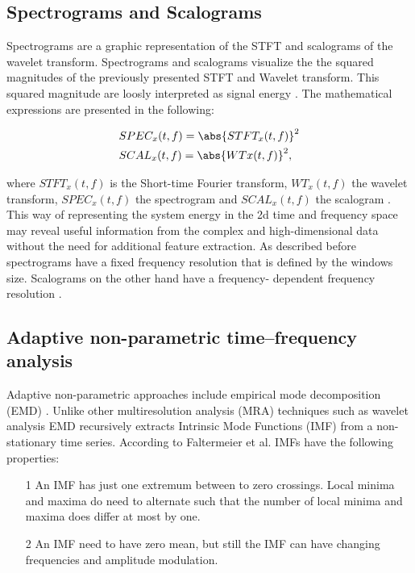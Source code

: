 \subsection{Spectrograms and Scalograms}

 Spectrograms are a graphic representation of the STFT and scalograms of the wavelet transform. Spectrograms and scalograms visualize the the squared magnitudes of the previously presented STFT and Wavelet transform. This squared magnitude are loosly interpreted as signal energy \cite{Hlawatsch1992}. The mathematical expressions are presented in the following: 

\begin{equation}
    \begin{aligned}
        &SPEC_{x}(t,f) = \abs{STFT_{x}(t,f)}^{2} \\
        &SCAL_{x}(t,f) = \abs{WT{x}(t,f)}^{2}, 
    \end{aligned}
\end{equation}

where $STFT_{x}(t,f)$ is the Short-time Fourier transform, $WT_{x}(t,f)$ the wavelet transform, $SPEC_{x}(t,f)$ the spectrogram and $SCAL_{x}(t,f)$ the scalogram \cite{Hlawatsch1992}. This way of representing the system energy in the 2d time and frequency space may reveal useful information from the complex and high-dimensional data without the need for additional feature extraction. As described before spectrograms have a fixed frequency resolution that is defined by the windows size. Scalograms on the other hand have a frequency- dependent frequency resolution \cite{Verstraete2017}.

\subsection{Adaptive non-parametric time–frequency analysis}
Adaptive non-parametric approaches include empirical mode decomposition (EMD) \cite{FENG2013}. Unlike other multiresolution analysis (MRA) techniques such as wavelet analysis EMD recursively extracts Intrinsic Mode Functions (IMF) from a non-stationary time series. According to Faltermeier et al. \cite{Faltermeier2010} IMFs have the following properties: 

\begin{itemize}
    \item [1] An IMF has just one extremum between to zero crossings. Local minima and maxima do need to alternate such that the number of local minima and maxima does differ at most by one. 
    \item[2] An IMF need to have zero mean, but still the IMF can have changing frequencies and amplitude modulation. 
\end{itemize}

